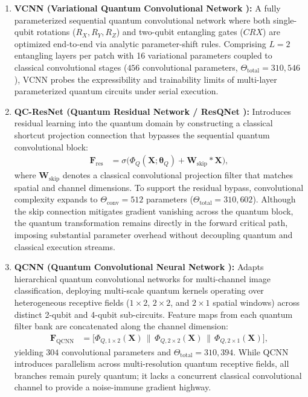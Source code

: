 \documentclass[journal]{IEEEtran}
\begin{document}
\begin{enumerate}
    \item \textbf{VCNN (Variational Quantum Convolutional Network \cite{huang2021experimental}):} A fully parameterized sequential quantum convolutional network where both single-qubit rotations ($R_X, R_Y, R_Z$) and two-qubit entangling gates ($CRX$) are optimized end-to-end via analytic parameter-shift rules. Comprising $L=2$ entangling layers per patch with 16 variational parameters coupled to classical convolutional stages ($456$ convolutional parameters, $\Theta_{\mathrm{total}} = 310{,}546$), VCNN probes the expressibility and trainability limits of multi-layer parameterized quantum circuits under serial execution.

    \item \textbf{QC-ResNet (Quantum Residual Network / ResQNet \cite{kashif2024resqnets}):} Introduces residual learning into the quantum domain by constructing a classical shortcut projection connection that bypasses the sequential quantum convolutional block:
    \begin{align}
    \mathbf{F}_{\mathrm{res}} &= \sigma\Big( \Phi_Q(\mathbf{X}; \boldsymbol{\theta}_Q) + \mathbf{W}_{\mathrm{skip}} * \mathbf{X} \Big),
    \label{eq:qc_resnet_formulation}
    \end{align}
    where $\mathbf{W}_{\mathrm{skip}}$ denotes a classical convolutional projection filter that matches spatial and channel dimensions. To support the residual bypass, convolutional complexity expands to $\Theta_{\mathrm{conv}} = 512$ parameters ($\Theta_{\mathrm{total}} = 310{,}602$). Although the skip connection mitigates gradient vanishing across the quantum block, the quantum transformation remains directly in the forward critical path, imposing substantial parameter overhead without decoupling quantum and classical execution streams.

    \item \textbf{QCNN (Quantum Convolutional Neural Network \cite{chen2023qcnn}):} Adapts hierarchical quantum convolutional networks for multi-channel image classification, deploying multi-scale quantum kernels operating over heterogeneous receptive fields ($1 \times 2$, $2 \times 2$, and $2 \times 1$ spatial windows) across distinct 2-qubit and 4-qubit sub-circuits. Feature maps from each quantum filter bank are concatenated along the channel dimension:
    \begin{align}
    \mathbf{F}_{\mathrm{QCNN}} &= \Big[ \Phi_{Q, 1\times 2}(\mathbf{X}) \,\|\, \Phi_{Q, 2\times 2}(\mathbf{X}) \,\|\, \Phi_{Q, 2\times 1}(\mathbf{X}) \Big],
    \label{eq:qcnn_fusion}
    \end{align}
    yielding $304$ convolutional parameters and $\Theta_{\mathrm{total}} = 310{,}394$. While QCNN introduces parallelism across multi-resolution quantum receptive fields, all branches remain purely quantum; it lacks a concurrent classical convolutional channel to provide a noise-immune gradient highway.
\end{enumerate}
\end{document}
